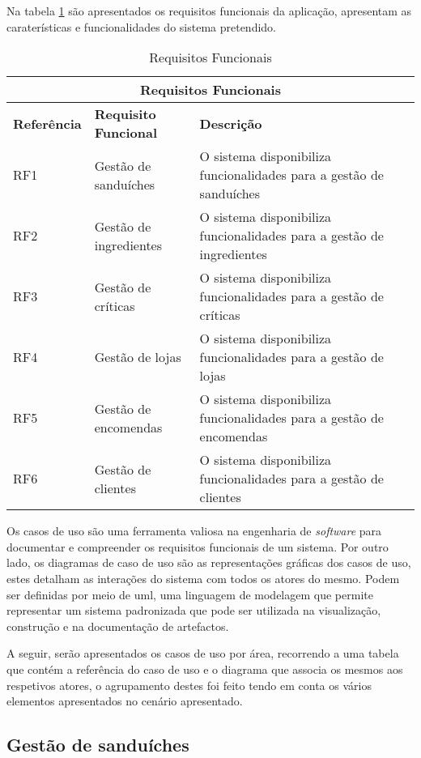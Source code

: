 Na tabela \ref{table:reqF} são apresentados os requisitos funcionais da aplicação, apresentam as caraterísticas e funcionalidades do sistema pretendido.
\begin{table}[H]
\caption{Requisitos Funcionais}
\label{table:reqF}
\begin{center}
\begin{tabular}{ |p{2cm}|p{4cm}|p{6cm}|  }
\hline
\multicolumn{3}{|c|}{Requisitos Funcionais} \\
\hline
\textbf{Referência} & \textbf{Requisito Funcional} & \textbf{Descrição} \\
\hline
RF1 & Gestão de sanduíches & O sistema disponibiliza  funcionalidades para a gestão de sanduíches \\
\hline
RF2 & Gestão de ingredientes & O sistema disponibiliza  funcionalidades para a gestão de ingredientes\\
\hline
RF3 & Gestão de críticas & O sistema disponibiliza  funcionalidades para a gestão de críticas\\
\hline
RF4 & Gestão de lojas & O sistema disponibiliza  funcionalidades para a gestão de lojas\\
\hline
RF5 & Gestão de encomendas & O sistema disponibiliza  funcionalidades para a gestão de encomendas\\
\hline
RF6 & Gestão de clientes & O sistema disponibiliza  funcionalidades para a gestão de clientes\\
\hline
\end{tabular} 
\end{center}
\end{table}

Os casos de uso são uma ferramenta valiosa na engenharia de \textit{software} para documentar e compreender os requisitos funcionais de um sistema. Por outro lado, os diagramas de caso de uso são as representações gráficas dos casos de uso, estes detalham as interações do sistema com todos os atores do mesmo. Podem ser definidas por meio de \ac{uml}, uma linguagem de modelagem que permite representar um sistema padronizada que pode ser utilizada na visualização, construção e na documentação de artefactos.

A seguir, serão apresentados os casos de uso por área, recorrendo a uma tabela que contém a referência do caso de uso e o diagrama que associa os mesmos aos respetivos atores, o agrupamento destes foi feito tendo em conta os vários elementos apresentados no cenário apresentado.

\subsection{Gestão de sanduíches}

